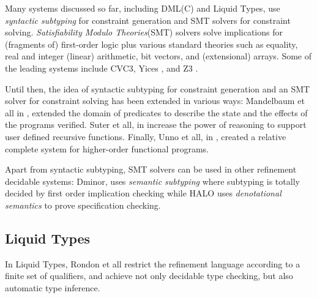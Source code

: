 Many systems discussed so far, including DML(C) and Liquid Types, 
use \textit{syntactic subtyping} for constraint 
generation and SMT solvers for constraint solving.
\textit{Satisfiability Modulo Theories}(SMT) solvers solve implications 
for (fragments of) first-order logic plus various standard theories such as
equality, real and integer (linear) arithmetic, bit vectors, and (extensional) arrays. 
Some of the leading systems include  CVC3\cite{CVC3}, Yices \cite{Yices}, and Z3 \cite{z3}.

Until then, the idea of syntactic subtyping for constraint generation
and an SMT solver for constraint solving has been extended in various ways:
%
Mandelbaum et all in \cite{MandelbaumWalker03},
extended the domain of predicates to describe the state 
and the effects of the programs verified.
%
Suter et all, in \cite{SuterKK11} increase the power of reasoning 
to support user defined recursive functions.
Finally,  Unno et all, in \cite{UnnoTK13},
created a relative complete system for higher-order functional programs.
 
Apart from syntactic subtyping, SMT solvers can be used in other 
refinement decidable systems:
Dminor, \cite{dminor} uses \textit{semantic subtyping} where subtyping is totally 
decided by first order implication checking while 
HALO \cite{VytiniotisJCR13} uses \textit{denotational semantics}
to prove specification checking.




%

\subsection{Liquid Types}\label{subsec:liquid}

In Liquid Types\cite{LiquidPLDI08}, 
Rondon et all restrict the refinement language according to a 
finite set of qualifiers, and achieve not only decidable type checking, but also automatic
type inference.

